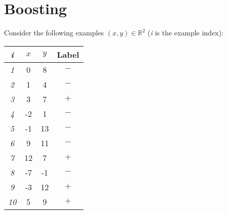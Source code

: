\documentclass[11pt]{article}
\begin{document}

\solution{}



\section {Boosting }
  Consider the following examples $(x,y) \in \mathbb{R}^2$ ({\em i} is the example index):
  \begin{center}
    \begin{tabular}{|c|c|c|c|}
      \hline
      {\em i}  & $x$  & $y$ & Label \\
      \hline
      {\em 1}  & 0  & 8 & $-$ \\
      \hline
      {\em 2}  & 1  & 4 & $-$ \\
      \hline
      {\em 3}  & 3  & 7 & $+$ \\
      \hline
      {\em 4}  & -2  & 1 & $-$ \\
      \hline
      {\em 5}  & -1  & 13 & $-$ \\
      \hline
      {\em 6}  & 9  & 11 & $-$ \\
      \hline
      {\em 7}  & 12 & 7 & $+$ \\
      \hline
      {\em 8}  & -7  & -1 & $-$ \\
      \hline
      {\em 9}  & -3  & 12 & $+$ \\
      \hline
      {\em 10} & 5  & 9 & $+$ \\
      \hline
    \end{tabular}
  \end{center}
\end{document}
